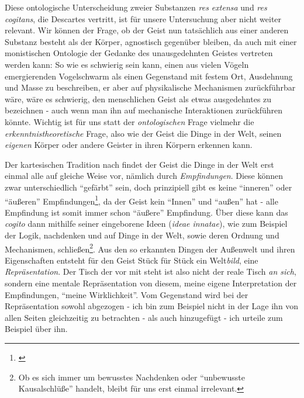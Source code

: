 \documentclass[a4paper, 12pt]{article}
\begin{document}
\begin{onehalfspace}
Diese ontologische Unterscheidung zweier Substanzen \emph{res extensa} und \emph{res cogitans}, die Descartes vertritt, ist für unsere Untersuchung aber nicht weiter relevant. Wir können der Frage, ob der Geist nun tatsächlich aus einer anderen Substanz besteht als der Körper, agnostisch gegenüber bleiben, da auch mit einer monistischen Ontologie der Gedanke des unausgedehnten Geistes vertreten werden kann: So wie es schwierig sein kann, einen aus vielen Vögeln emergierenden Vogelschwarm als einen Gegenstand mit festem Ort, Ausdehnung und Masse zu beschreiben, er aber auf physikalische Mechanismen zurückführbar wäre, wäre es schwierig, den menschlichen Geist als etwas ausgedehntes zu bezeichnen - auch wenn man ihn auf mechanische Interaktionen zurückführen könnte. Wichtig ist für uns statt der \emph{ontologischen} Frage vielmehr die \emph{erkenntnistheoretische} Frage, also wie der Geist die Dinge in der Welt, seinen \emph{eigenen} Körper oder andere Geister in ihren Körpern erkennen kann.


Der kartesischen Tradition nach findet der Geist die Dinge in der Welt erst einmal alle auf gleiche Weise vor, nämlich durch \emph{Empfindungen}. Diese können zwar unterschiedlich "`gefärbt"' sein, doch prinzipiell gibt es keine "`inneren"' oder "`äußeren"' Empfindungen\footnote{\Cite[Vgl.][S. ?? (501?)]{scheler-ethik}}, da der Geist kein "`Innen"' und "`außen"' hat - alle Empfindung ist somit immer schon "`äußere"' Empfindung. Über diese kann das \emph{cogito} dann mithilfe seiner eingeborene Ideen (\emph{ideae innatae}), wie zum Beispiel der Logik, nachdenken und auf Dinge in der Welt, sowie deren Ordnung und Mechanismen, schließen\footnote{Ob es sich immer um bewusstes Nachdenken oder "`unbewusste Kausalschlüße"' handelt, bleibt für uns erst einmal irrelevant.}. Aus den so erkannten Dingen der Außenwelt und ihren Eigenschaften entsteht für den Geist Stück für Stück ein Welt\emph{bild}, eine \emph{Repräsentation}. Der Tisch der vor mit steht ist also nicht der reale Tisch \emph{an sich}, sondern eine mentale Repräsentation von diesem, meine eigene Interpretation der Empfindungen, "`meine Wirklichkeit"'. Vom Gegenstand wird bei der Repräsentation sowohl abgezogen - ich bin zum Beispiel nicht in der Lage ihn von allen Seiten gleichzeitig zu betrachten - als auch hinzugefügt - ich urteile zum Beispiel über ihn.


\end{onehalfspace}
\end{document}
